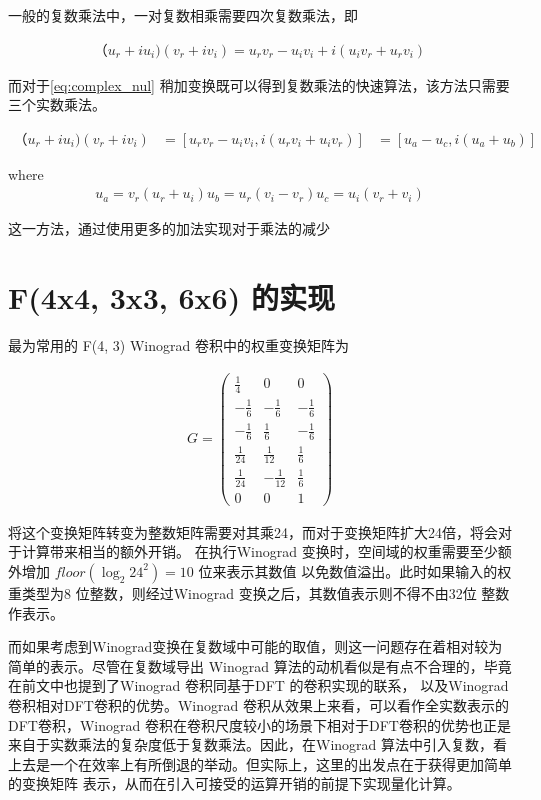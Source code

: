一般的复数乘法中，一对复数相乘需要四次复数乘法，即

\begin{align}
\label{eq:complex_mul}
  （u_r + i u_i) (v_r + i v_i) = u_r v_r - u_i v_i + i ( u_i v_r + u_r v_i )
\end{align}

而对于\ref{eq:complex_nul} 稍加变换既可以得到复数乘法的快速算法，该方法只需要三个实数乘法。

\begin{align}
\label{eq:complex_mul_fast}
  （u_r + i u_i) (v_r + i v_i) &= [ u_r v_r - u_i v_i, i(u_r v_i + u_i v_r)]
                               &= [ u_a - u_c,i( u_a + u_b) ]
\end{align}

where 
\begin{align}
u_a = v_r ( u_r + u_i )
u_b = u_r ( v_i - v_r )
u_c = u_i ( v_r + v_i )
\end{align}

这一方法，通过使用更多的加法实现对于乘法的减少 

\section{F(4x4, 3x3, 6x6) 的实现}

最为常用的 F(4, 3) Winograd 卷积中的权重变换矩阵为

\begin{align}
  G = 
  \begin{pmatrix}
    \frac{1}{4} & 0 & 0 \\
    -\frac{1}{6} & -\frac{1}{6} & -\frac{1}{6} \\
    -\frac{1}{6} & \frac{1}{6} & -\frac{1}{6} \\
    \frac{1}{24} & \frac{1}{12} & \frac{1}{6} \\
    \frac{1}{24} & -\frac{1}{12} & \frac{1}{6} \\
    0 & 0 & 1
  \end{pmatrix}
\end{align}

将这个变换矩阵转变为整数矩阵需要对其乘24，而对于变换矩阵扩大24倍，将会对于计算带来相当的额外开销。
在执行Winograd 变换时，空间域的权重需要至少额外增加 $floor(\log_{2}{24^2}) = 10$ 位来表示其数值
以免数值溢出。此时如果输入的权重类型为8 位整数，则经过Winograd 变换之后，其数值表示则不得不由32位
整数作表示。

而如果考虑到Winograd变换在复数域中可能的取值，则这一问题存在着相对较为简单的表示。尽管在复数域导出
Winograd 算法的动机看似是有点不合理的，毕竟在前文中也提到了Winograd 卷积同基于DFT 的卷积实现的联系，
以及Winograd 卷积相对DFT卷积的优势。Winograd 卷积从效果上来看，可以看作全实数表示的DFT卷积，Winograd
卷积在卷积尺度较小的场景下相对于DFT卷积的优势也正是来自于实数乘法的复杂度低于复数乘法。因此，在Winograd
算法中引入复数，看上去是一个在效率上有所倒退的举动。但实际上，这里的出发点在于获得更加简单的变换矩阵
表示，从而在引入可接受的运算开销的前提下实现量化计算。

